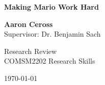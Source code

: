 \documentclass[11pt, a4paper, oneside]{report} %
\begin{document}



\begin{titlepage}
    \begin{center}
        \vspace*{4cm}
        
        \Huge\textbf{Making Mario Work Hard}
        
        
        \vspace{2.5cm}
        
       \Large\textbf{Aaron Ceross}
       \\Supervisor: Dr. Benjamin Sach
        
        \vspace{0.8cm}
        
        Research Review\\
        COMSM2202 Research Skills
        
        \vspace{0.8cm}
        \vspace{0.8cm}
        
        
        \today
        
    \end{center}
\end{titlepage}



\tableofcontents

\end{document}
